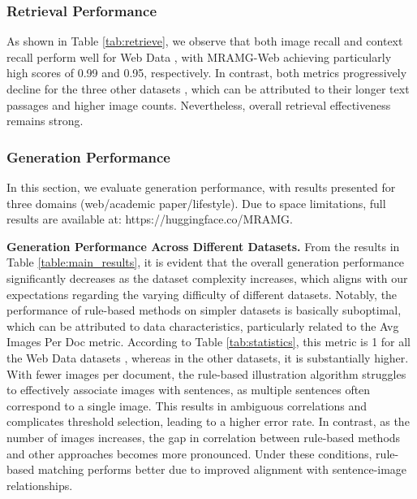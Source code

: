
\subsubsection{Retrieval Performance}

As shown in Table \ref{tab:retrieve}, we observe that both image recall and context recall perform well for Web Data %
, with MRAMG-Web achieving particularly high scores of 0.99 and 0.95, respectively. 
In contrast, both metrics progressively decline for the three other datasets
, which can be attributed to their longer text passages and higher image counts. Nevertheless, overall retrieval effectiveness remains strong. 
\vspace{-8pt}
\subsubsection{Generation Performance}
\label{generation}

In this section, we evaluate generation performance, with results presented for three domains (web/academic paper/lifestyle). Due to space limitations, full results are available at: https://huggingface.co/MRAMG.


\textbf{Generation Performance Across Different Datasets.} From the results in Table \ref{table:main_results}, it is evident that the overall generation performance significantly decreases as the dataset complexity increases, which aligns with our expectations regarding the varying difficulty of different datasets. Notably, the performance of rule-based methods on simpler datasets is basically suboptimal, which can be attributed to data characteristics, particularly related to the Avg Images Per Doc metric. According to Table \ref{tab:statistics}, this metric is 1 for all the Web Data datasets 
, whereas in the other datasets, it is substantially higher. With fewer images per document, the rule-based illustration algorithm struggles to effectively associate images with sentences, as multiple sentences often correspond to a single image. This results in ambiguous correlations and complicates threshold selection, leading to a higher error rate. In contrast, as the number of images increases, the gap in correlation between rule-based methods and other approaches becomes more pronounced. Under these conditions, rule-based matching performs better due to improved alignment with sentence-image relationships.

